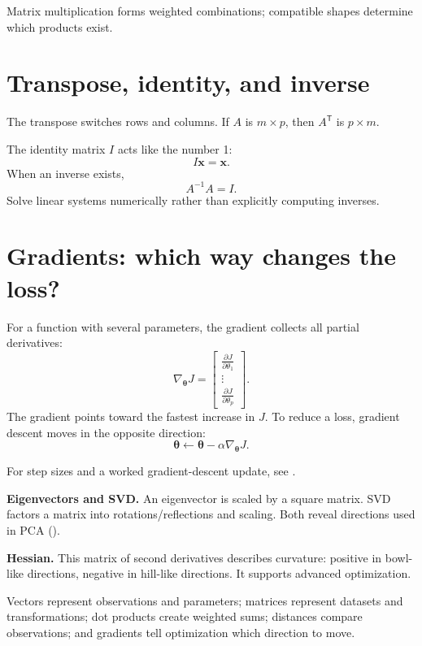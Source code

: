 \begin{intuition}
Matrix multiplication forms weighted combinations; compatible shapes determine which products exist.
\end{intuition}

\section{Transpose, identity, and inverse}

The transpose switches rows and columns. If $A$ is $m\times p$, then $A^{\mathsf T}$ is $p\times m$.

The identity matrix $I$ acts like the number 1:
\[
  I\bm{x}=\bm{x}.
\]
When an inverse exists,
\[
  A^{-1}A=I.
\]
Solve linear systems numerically rather than explicitly computing inverses.

\section{Gradients: which way changes the loss?}

For a function with several parameters, the gradient collects all partial derivatives:
\[
  \nabla_{\bm{\theta}}J=
  \begin{bmatrix}
  \frac{\partial J}{\partial\theta_1}\\
  \vdots\\
  \frac{\partial J}{\partial\theta_p}
  \end{bmatrix}.
\]
The gradient points toward the fastest increase in $J$. To reduce a loss, gradient descent moves in the opposite direction:
\[
  \bm{\theta}\leftarrow\bm{\theta}-\alpha\nabla_{\bm{\theta}}J.
\]

For step sizes and a worked gradient-descent update, see .

\begin{optionaltopic}
\textbf{Eigenvectors and SVD.} An eigenvector is scaled by a square matrix. SVD factors a matrix into rotations/reflections and scaling. Both reveal directions used in PCA ().
\end{optionaltopic}

\begin{optionaltopic}
\textbf{Hessian.} This matrix of second derivatives describes curvature: positive in bowl-like directions, negative in hill-like directions. It supports advanced optimization.
\end{optionaltopic}

\begin{keyidea}
Vectors represent observations and parameters; matrices represent datasets and transformations; dot products create weighted sums; distances compare observations; and gradients tell optimization which direction to move.
\end{keyidea}

